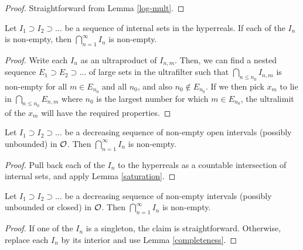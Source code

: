 \begin{proof}\leanok Straightforward from Lemma \ref{log-mult}.
\end{proof}

\begin{lemma}\label{saturation}\leanok Let $I_1 \supset I_2 \supset \dots$ be a sequence of internal sets in the hyperreals.  If each of the $I_n$ is non-empty, then $\bigcap_{n=1}^\infty I_n$ is non-empty.
\end{lemma}

\begin{proof}  Write each $I_n$ as an ultraproduct of $I_{n,m}$.  Then, we can find a nested sequence $E_1 \supset E_2 \supset \dots$ of large sets in the ultrafilter such that $\bigcap_{n \leq n_0} I_{n,m}$ is non-empty for all $m \in E_{n_0}$ and all $n_0$, and also $n_0 \not \in E_{n_0}$.  If we then pick $x_m$ to lie in $\bigcap_{n \leq n_0} E_{n,m}$ where $n_0$ is the largest number for which $m \in E_{n_0}$, the ultralimit of the $x_m$ will have the required properties.
\end{proof}

\begin{lemma}[Completeness]\label{completeness} Let $I_1 \supset I_2 \supset \dots$ be a decreasing sequence of non-empty open intervals (possibly unbounded) in ${\mathcal O}$.  Then $\bigcap_{n=1}^\infty I_n$ is non-empty.
\end{lemma}

\begin{proof} Pull back each of the $I_n$ to the hyperreals as a countable intersection of internal sets, and apply Lemma \ref{saturation}.
\end{proof}

\begin{lemma}[Completeness, II]\label{completeness-2} Let $I_1 \supset I_2 \supset \dots$ be a decreasing sequence of non-empty intervals (possibly unbounded or closed) in ${\mathcal O}$.  Then $\bigcap_{n=1}^\infty I_n$ is non-empty.
\end{lemma}

\begin{proof}   If one of the $I_n$ is a singleton, the claim is straightforward.  Otherwise, replace each $I_n$ by its interior and use Lemma \ref{completeness}.
\end{proof}


